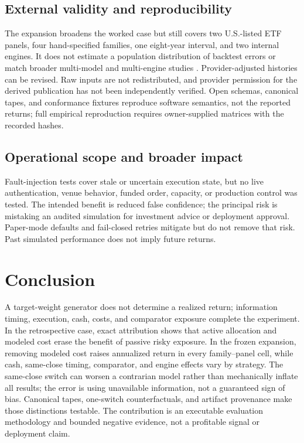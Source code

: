 \documentclass{article}
\begin{document}
\subsection{External validity and reproducibility}

The expansion broadens the worked case but still covers two U.S.-listed ETF
panels, four hand-specified families, one eight-year interval, and two internal
engines. It does not estimate a population distribution of backtest errors or
match broader multi-model and multi-engine studies
\citep{zhang2026alpha,yin2026implementation}. Provider-adjusted histories can be
revised. Raw inputs are not redistributed, and provider permission for the
derived publication has not been independently verified. Open schemas,
canonical tapes, and conformance fixtures reproduce software semantics, not the
reported returns; full empirical reproduction requires owner-supplied matrices
with the recorded hashes.

\subsection{Operational scope and broader impact}

Fault-injection tests cover stale or uncertain execution state, but no live
authentication, venue behavior, funded order, capacity, or production control
was tested. The intended benefit is reduced false confidence; the principal
risk is mistaking an audited simulation for investment advice or deployment
approval. Paper-mode defaults and fail-closed retries mitigate but do not remove
that risk. Past simulated performance does not imply future returns.

\section{Conclusion}

A target-weight generator does not determine a realized return; information
timing, execution, cash, costs, and comparator exposure complete the experiment.
In the retrospective case, exact attribution shows that active allocation and
modeled cost erase the benefit of passive risky exposure. In the frozen
expansion, removing modeled cost raises annualized return in every family--panel
cell, while cash,
same-close timing, comparator, and engine effects vary by strategy. The
same-close switch can worsen a contrarian model rather than mechanically inflate
all results; the error is using unavailable information, not a guaranteed sign
of bias. Canonical tapes, one-switch counterfactuals, and artifact provenance
make those distinctions testable. The contribution is an executable evaluation
methodology and bounded negative evidence, not a profitable signal or deployment
claim.
\end{document}
